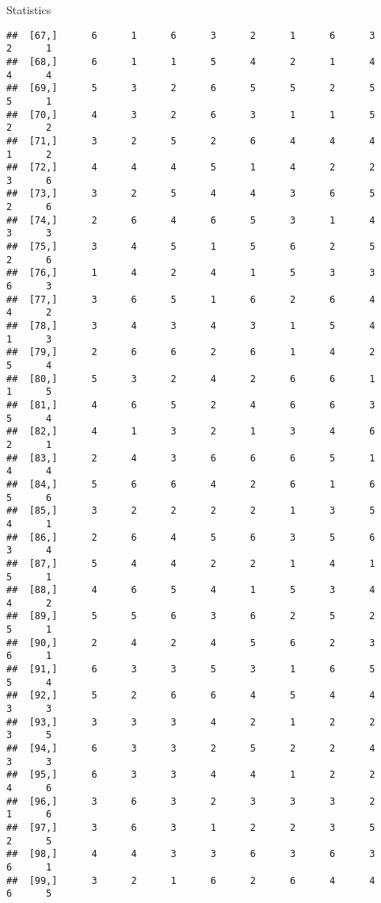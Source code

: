 \documentclass[
  ignorenonframetext,
]{beamer}
\begin{document}
\begin{frame}[fragile]{Statistics}
\begin{verbatim}
##  [67,]      6      1      6      3      2      1      6      3      2      1
##  [68,]      6      1      1      5      4      2      1      4      4      4
##  [69,]      5      3      2      6      5      5      2      5      5      1
##  [70,]      4      3      2      6      3      1      1      5      2      2
##  [71,]      3      2      5      2      6      4      4      4      1      2
##  [72,]      4      4      4      5      1      4      2      2      3      6
##  [73,]      3      2      5      4      4      3      6      5      2      6
##  [74,]      2      6      4      6      5      3      1      4      3      3
##  [75,]      3      4      5      1      5      6      2      5      2      6
##  [76,]      1      4      2      4      1      5      3      3      6      3
##  [77,]      3      6      5      1      6      2      6      4      4      2
##  [78,]      3      4      3      4      3      1      5      4      1      3
##  [79,]      2      6      6      2      6      1      4      2      5      4
##  [80,]      5      3      2      4      2      6      6      1      1      5
##  [81,]      4      6      5      2      4      6      6      3      5      4
##  [82,]      4      1      3      2      1      3      4      6      2      1
##  [83,]      2      4      3      6      6      6      5      1      4      4
##  [84,]      5      6      6      4      2      6      1      6      5      6
##  [85,]      3      2      2      2      2      1      3      5      4      1
##  [86,]      2      6      4      5      6      3      5      6      3      4
##  [87,]      5      4      4      2      2      1      4      1      5      1
##  [88,]      4      6      5      4      1      5      3      4      4      2
##  [89,]      5      5      6      3      6      2      5      2      5      1
##  [90,]      2      4      2      4      5      6      2      3      6      1
##  [91,]      6      3      3      5      3      1      6      5      5      4
##  [92,]      5      2      6      6      4      5      4      4      3      3
##  [93,]      3      3      3      4      2      1      2      2      3      5
##  [94,]      6      3      3      2      5      2      2      4      3      3
##  [95,]      6      3      3      4      4      1      2      2      4      6
##  [96,]      3      6      3      2      3      3      3      2      1      6
##  [97,]      3      6      3      1      2      2      3      5      2      5
##  [98,]      4      4      3      3      6      3      6      3      6      1
##  [99,]      3      2      1      6      2      6      4      4      6      5

\end{verbatim}
\end{frame}
\end{document}

